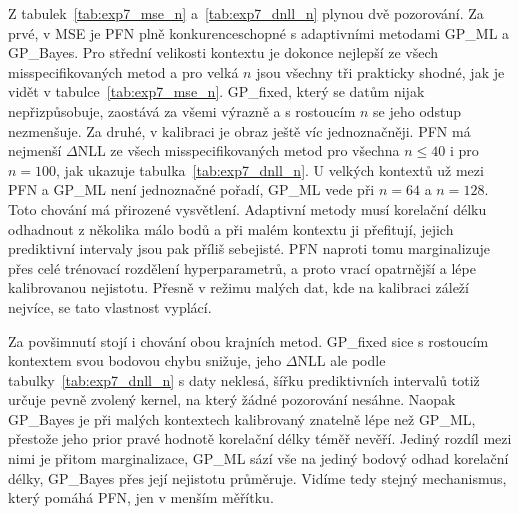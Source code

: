 Z tabulek~\ref{tab:exp7_mse_n} a~\ref{tab:exp7_dnll_n} plynou dvě pozorování.
Za prvé, v MSE je PFN plně konkurenceschopné s adaptivními metodami GP\_ML a GP\_Bayes.
Pro střední velikosti kontextu je dokonce nejlepší ze všech misspecifikovaných metod a pro velká $n$ jsou všechny tři prakticky shodné, jak je vidět v tabulce~\ref{tab:exp7_mse_n}.
GP\_fixed, který se datům nijak nepřizpůsobuje, zaostává za všemi výrazně a s rostoucím $n$ se jeho odstup nezmenšuje.
Za druhé, v kalibraci je obraz ještě víc jednoznačněji.
PFN má nejmenší $\Delta$NLL ze všech misspecifikovaných metod pro všechna $n \leq 40$ i pro $n = 100$, jak ukazuje tabulka~\ref{tab:exp7_dnll_n}.
U velkých kontextů už mezi PFN a GP\_ML není jednoznačné pořadí, GP\_ML vede při $n = 64$ a $n = 128$.
Toto chování má přirozené vysvětlení.
Adaptivní metody musí korelační délku odhadnout z několika málo bodů a při malém kontextu ji přefitují, jejich prediktivní intervaly jsou pak příliš sebejisté.
PFN naproti tomu marginalizuje přes celé trénovací rozdělení hyperparametrů, a proto vrací opatrnější a lépe kalibrovanou nejistotu.
Přesně v režimu malých dat, kde na kalibraci záleží nejvíce, se tato vlastnost vyplácí.
\par

Za povšimnutí stojí i chování obou krajních metod.
GP\_fixed sice s rostoucím kontextem svou bodovou chybu snižuje, jeho $\Delta$NLL ale podle tabulky~\ref{tab:exp7_dnll_n} s daty neklesá, šířku prediktivních intervalů totiž určuje pevně zvolený kernel, na který žádné pozorování nesáhne.
Naopak GP\_Bayes je při malých kontextech kalibrovaný znatelně lépe než GP\_ML, přestože jeho prior pravé hodnotě korelační délky téměř nevěří.
Jediný rozdíl mezi nimi je přitom marginalizace, GP\_ML sází vše na jediný bodový odhad korelační délky, GP\_Bayes přes její nejistotu průměruje.
Vidíme tedy stejný mechanismus, který pomáhá PFN, jen v menším měřítku.
\par

